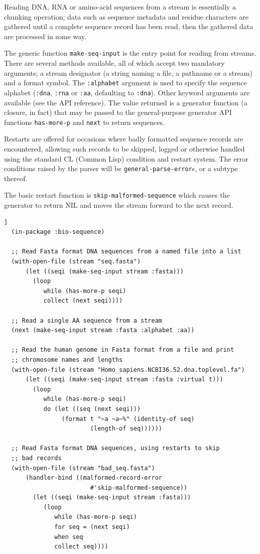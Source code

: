 \documentclass[a4paper, 12pt]{article}
\begin{document}
Reading DNA, RNA or amino-acid sequences from a stream is essentially
a chunking operation; data such as sequence metadata and residue
characters are gathered until a complete sequence record has been
read, then the gathered data are processed in some way.

The generic function \lstinline!make-seq-input! is the entry point for
reading from streams. There are several methods available, all of
which accept two mandatory arguments; a stream designator (a string
naming a file, a pathname or a stream) and a format symbol. The
\lstinline!:alphabet! argument is used to specify the sequence
alphabet (\lstinline!:dna!, \lstinline!:rna! or \lstinline!:aa!,
defaulting to \lstinline!:dna!). Other keyword arguments are available
(see the API reference). The value returned is a generator function (a
closure, in fact) that may be passed to the general-purpose generator
API functions \lstinline!has-more-p! and \lstinline!next! to return
sequences.

Restarts are offered for occasions where badly formatted sequence
records are encountered, allowing such records to be skipped, logged
or otherwise handled using the standard CL (Common Lisp) condition and
restart system. The error conditions raised by the parser will be
\lstinline!general-parse-error!s, or a subtype thereof.

The basic restart function is \lstinline!skip-malformed-sequence!
which causes the generator to return NIL and moves the stream forward
to the next record.

\begin{lstlisting}[caption={Making sequences from streams},
  label=lst:read-bioseq-stream,float=[tbph]]
  (in-package :bio-sequence)
  
  ;; Read Fasta format DNA sequences from a named file into a list
  (with-open-file (stream "seq.fasta")
      (let ((seqi (make-seq-input stream :fasta)))
        (loop
           while (has-more-p seqi)
           collect (next seqi))))

  ;; Read a single AA sequence from a stream
  (next (make-seq-input stream :fasta :alphabet :aa))

  ;; Read the human genome in Fasta format from a file and print
  ;; chromosome names and lengths
  (with-open-file (stream "Homo_sapiens.NCBI36.52.dna.toplevel.fa")
      (let ((seqi (make-seq-input stream :fasta :virtual t)))
        (loop
           while (has-more-p seqi)
           do (let ((seq (next seqi)))
                (format t "~a ~a~%" (identity-of seq)
                        (length-of seq))))))

  ;; Read Fasta format DNA sequences, using restarts to skip
  ;; bad records
  (with-open-file (stream "bad_seq.fasta")
      (handler-bind ((malformed-record-error
                        #'skip-malformed-sequence))
        (let ((seqi (make-seq-input stream :fasta)))
           (loop
              while (has-more-p seqi)
              for seq = (next seqi)
              when seq
              collect seq))))
\end{lstlisting}
\end{document}
